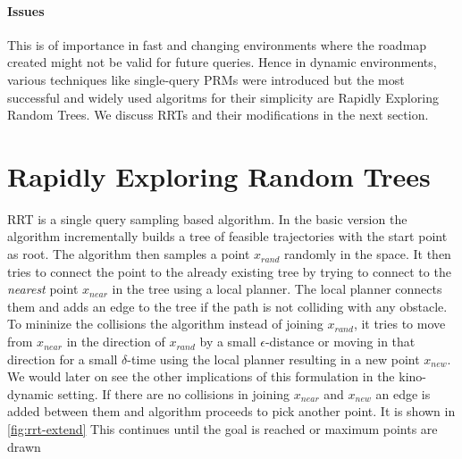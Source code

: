 \documentclass[MTech]{iitmdiss}
\begin{document}
\subsubsection*{Issues}
 This is of importance in fast and changing environments where the roadmap created might not be valid for future queries. Hence in dynamic environments, various techniques like single-query PRMs were introduced but the most successful and widely used algoritms for their simplicity are Rapidly Exploring Random Trees. We discuss RRTs and their modifications in the next section.  

\chapter{Rapidly Exploring Random Trees}

RRT is a single query sampling based algorithm. In the basic version the algorithm incrementally builds a tree of feasible trajectories with the start point as root. The algorithm then samples a point $x_{rand}$ randomly in the space. It then tries to connect the point to the already existing tree by trying to connect to the \emph{nearest} point $x_{near}$ in the tree using a local planner. The local planner connects them and adds an edge to the tree if the path is not colliding with any obstacle. To mininize the collisions the algorithm instead of joining $x_{rand}$, it tries to move from $x_{near}$ in the direction of $x_{rand}$ by a small $\epsilon$-distance or moving in that direction for a small $\delta$-time using the local planner resulting in a new point $x_{new}$. We would later on see the other implications of this formulation in the kino-dynamic setting. If there are no collisions in joining $x_{near}$ and $x_{new}$ an edge is added between them and algorithm proceeds to pick another point. It is shown in \ref{fig:rrt-extend} This continues until the goal is reached or maximum points are drawn 
\end{document}
